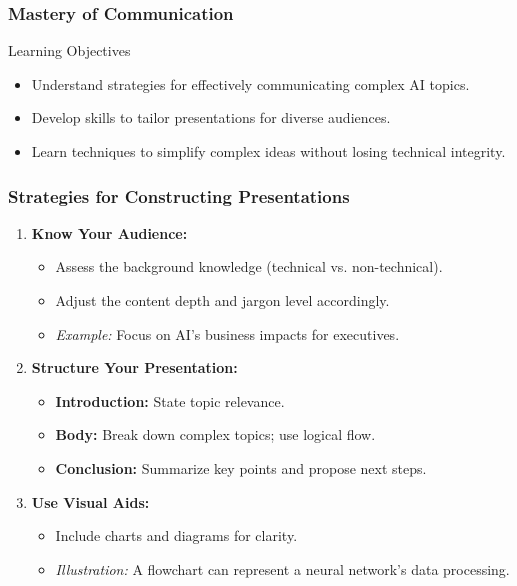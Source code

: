 \documentclass[aspectratio=169]{beamer}
\begin{document}
\begin{frame}[fragile]
    \frametitle{Mastery of Communication}
    \begin{block}{Learning Objectives}
        \begin{itemize}
            \item Understand strategies for effectively communicating complex AI topics.
            \item Develop skills to tailor presentations for diverse audiences.
            \item Learn techniques to simplify complex ideas without losing technical integrity.
        \end{itemize}
    \end{block}
\end{frame}

\begin{frame}[fragile]
    \frametitle{Strategies for Constructing Presentations}
    \begin{enumerate}
        \item \textbf{Know Your Audience:}
        \begin{itemize}
            \item Assess the background knowledge (technical vs. non-technical).
            \item Adjust the content depth and jargon level accordingly.
            \item \textit{Example:} Focus on AI's business impacts for executives.
        \end{itemize}

        \item \textbf{Structure Your Presentation:}
        \begin{itemize}
            \item \textbf{Introduction:} State topic relevance. 
            \item \textbf{Body:} Break down complex topics; use logical flow.
            \item \textbf{Conclusion:} Summarize key points and propose next steps.
        \end{itemize}

        \item \textbf{Use Visual Aids:}
        \begin{itemize}
            \item Include charts and diagrams for clarity.
            \item \textit{Illustration:} A flowchart can represent a neural network's data processing.
        \end{itemize}
    \end{enumerate}
\end{frame}
\end{document}

